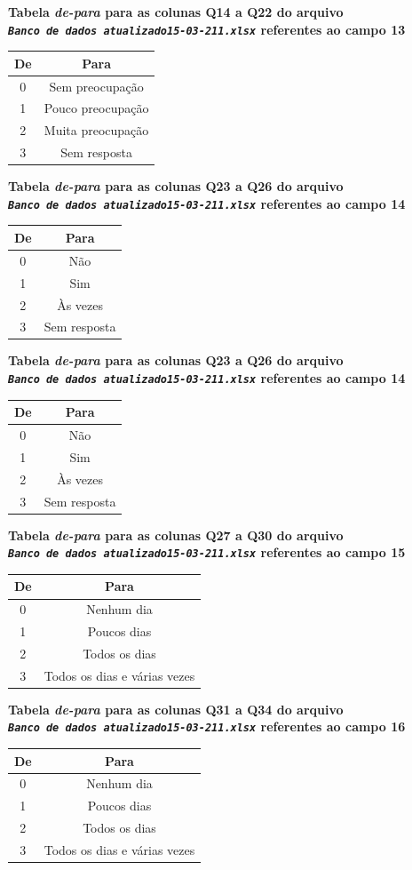 \documentclass[]{article}
\begin{document}
\textbf{Tabela \emph{de-para} para as colunas Q14 a Q22 do arquivo \emph{\texttt{Banco\ de\ dados\ atualizado15-03-211.xlsx}} referentes ao campo 13}

\begin{longtable}[]{@{}cc@{}}
\toprule
De & Para\tabularnewline
\midrule
\endhead
0 & Sem preocupação\tabularnewline
1 & Pouco preocupação\tabularnewline
2 & Muita preocupação\tabularnewline
3 & Sem resposta\tabularnewline
\bottomrule
\end{longtable}

\textbf{Tabela \emph{de-para} para as colunas Q23 a Q26 do arquivo \emph{\texttt{Banco\ de\ dados\ atualizado15-03-211.xlsx}} referentes ao campo 14}

\begin{longtable}[]{@{}cc@{}}
\toprule
De & Para\tabularnewline
\midrule
\endhead
0 & Não\tabularnewline
1 & Sim\tabularnewline
2 & Às vezes\tabularnewline
3 & Sem resposta\tabularnewline
\bottomrule
\end{longtable}

\textbf{Tabela \emph{de-para} para as colunas Q23 a Q26 do arquivo \emph{\texttt{Banco\ de\ dados\ atualizado15-03-211.xlsx}} referentes ao campo 14}

\begin{longtable}[]{@{}cc@{}}
\toprule
De & Para\tabularnewline
\midrule
\endhead
0 & Não\tabularnewline
1 & Sim\tabularnewline
2 & Às vezes\tabularnewline
3 & Sem resposta\tabularnewline
\bottomrule
\end{longtable}

\textbf{Tabela \emph{de-para} para as colunas Q27 a Q30 do arquivo \emph{\texttt{Banco\ de\ dados\ atualizado15-03-211.xlsx}} referentes ao campo 15}

\begin{longtable}[]{@{}cc@{}}
\toprule
De & Para\tabularnewline
\midrule
\endhead
0 & Nenhum dia\tabularnewline
1 & Poucos dias\tabularnewline
2 & Todos os dias\tabularnewline
3 & Todos os dias e várias vezes\tabularnewline
\bottomrule
\end{longtable}

\textbf{Tabela \emph{de-para} para as colunas Q31 a Q34 do arquivo \emph{\texttt{Banco\ de\ dados\ atualizado15-03-211.xlsx}} referentes ao campo 16}

\begin{longtable}[]{@{}cc@{}}
\toprule
De & Para\tabularnewline
\midrule
\endhead
0 & Nenhum dia\tabularnewline
1 & Poucos dias\tabularnewline
2 & Todos os dias\tabularnewline
3 & Todos os dias e várias vezes\tabularnewline
\bottomrule
\end{longtable}
\end{document}
